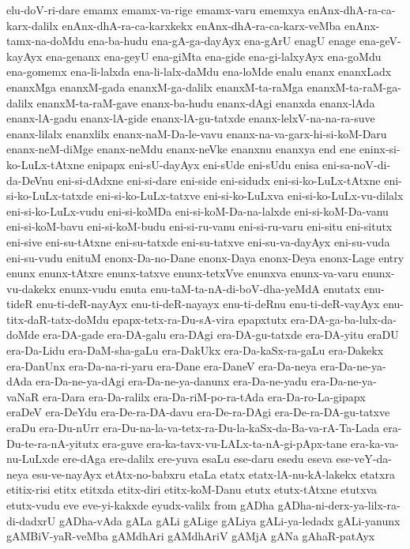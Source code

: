{elu-doV-ri-dare
emamx
emamx-va-rige
emamx-varu
ememxya
enAnx-dhA-ra-ca-karx-dalilx
enAnx-dhA-ra-ca-karxkekx
enAnx-dhA-ra-ca-karx-veMba
enAnx-tamx-na-doMdu
ena-ba-hudu
ena-gA-ga-dayAyx
ena-gArU
enagU
enage
ena-geV-kayAyx
ena-genanx
ena-geyU
ena-giMta
ena-gide
ena-gi-lalxyAyx
ena-goMdu
ena-gomemx
ena-li-lalxda
ena-li-lalx-daMdu
ena-loMde
enalu
enanx
enanxLadx
enanxMga
enanxM-gada
enanxM-ga-dalilx
enanxM-ta-raMga
enanxM-ta-raM-ga-dalilx
enanxM-ta-raM-gave
enanx-ba-hudu
enanx-dAgi
enanxda
enanx-lAda
enanx-lA-gadu
enanx-lA-gide
enanx-lA-gu-tatxde
enanx-lelxV-na-na-ra-suve
enanx-lilalx
enanxlilx
enanx-naM-Da-le-vavu
enanx-na-va-garx-hi-si-koM-Daru
enanx-neM-diMge
enanx-neMdu
enanx-neVke
enanxnu
enanxya
end
ene
eninx-si-ko-LuLx-tAtxne
enipapx
eni-sU-dayAyx
eni-sUde
eni-sUdu
enisa
eni-sa-noV-di-da-DeVnu
eni-si-dAdxne
eni-si-dare
eni-side
eni-sidudx
eni-si-ko-LuLx-tAtxne
eni-si-ko-LuLx-tatxde
eni-si-ko-LuLx-tatxve
eni-si-ko-LuLxva
eni-si-ko-LuLx-vu-dilalx
eni-si-ko-LuLx-vudu
eni-si-koMDa
eni-si-koM-Da-na-lalxde
eni-si-koM-Da-vanu
eni-si-koM-bavu
eni-si-koM-budu
eni-si-ru-vanu
eni-si-ru-varu
eni-situ
eni-situtx
eni-sive
eni-su-tAtxne
eni-su-tatxde
eni-su-tatxve
eni-su-va-dayAyx
eni-su-vuda
eni-su-vudu
enituM
enonx-Da-no-Dane
enonx-Daya
enonx-Deya
enonx-Lage
entry
enunx
enunx-tAtxre
enunx-tatxve
enunx-tetxVve
enunxva
enunx-va-varu
enunx-vu-dakekx
enunx-vudu
enuta
enu-taM-ta-nA-di-boV-dha-yeMdA
enutatx
enu-tideR
enu-ti-deR-nayAyx
enu-ti-deR-nayayx
enu-ti-deRnu
enu-ti-deR-vayAyx
enu-titx-daR-tatx-doMdu
epapx-tetx-ra-Du-sA-vira
epapxtutx
era-DA-ga-ba-lulx-da-doMde
era-DA-gade
era-DA-galu
era-DAgi
era-DA-gu-tatxde
era-DA-yitu
eraDU
era-Da-Lidu
era-DaM-sha-gaLu
era-DakUkx
era-Da-kaSx-ra-gaLu
era-Dakekx
era-DanUnx
era-Da-na-ri-yaru
era-Dane
era-DaneV
era-Da-neya
era-Da-ne-ya-dAda
era-Da-ne-ya-dAgi
era-Da-ne-ya-danunx
era-Da-ne-yadu
era-Da-ne-ya-vaNaR
era-Dara
era-Da-ralilx
era-Da-riM-po-ra-tAda
era-Da-ro-La-gipapx
eraDeV
era-DeYdu
era-De-ra-DA-davu
era-De-ra-DAgi
era-De-ra-DA-gu-tatxve
eraDu
era-Du-nUrr
era-Du-na-la-va-tetx-ra-Du-la-kaSx-da-Ba-va-rA-Ta-Lada
era-Du-te-ra-nA-yitutx
era-guve
era-ka-tavx-vu-LALx-ta-nA-gi-pApx-tane
era-ka-va-nu-LuLxde
ere-dAga
ere-dalilx
ere-yuva
esaLu
ese-daru
esedu
eseva
ese-veY-da-neya
esu-ve-nayAyx
etAtx-no-babxru
etaLa
etatx
etatx-lA-nu-kA-lakekx
etatxra
etitix-risi
etitx
etitxda
etitx-diri
etitx-koM-Danu
etutx
etutx-tAtxne
etutxva
etutx-vudu
eve
eve-yi-kakxde
eyudx-valilx
from
gADha
gADha-ni-derx-ya-lilx-ra-di-dadxrU
gADha-vAda
gALa
gALi
gALige
gALiya
gALi-ya-ledadx
gALi-yanunx
gAMBiV-yaR-veMba
gAMdhAri
gAMdhAriV
gAMjA
gANa
gAhaR-patAyx
}
